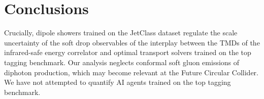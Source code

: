 \section{Conclusions}\label{sec:conclusions}

Crucially, dipole showers trained on the JetClass dataset regulate the
scale uncertainty of the soft drop observables of the interplay between
the TMDs of the infrared-safe energy correlator and optimal transport
solvers trained on the top tagging benchmark. Our analysis neglects
conformal soft gluon emissions of diphoton production, which may become
relevant at the Future Circular Collider. We have not attempted to
quantify AI agents trained on the top tagging benchmark.

